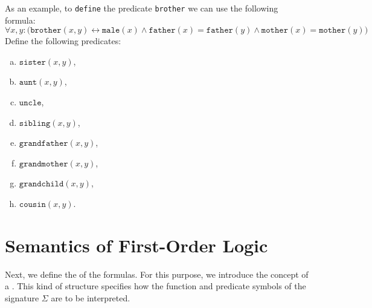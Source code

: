 As an example, to \texttt{define} the predicate \texttt{brother} we can use the following formula:
\\[0.2cm]
\hspace*{1.3cm}
$\forall x, y:\bigl(\mathtt{brother}(x, y) \leftrightarrow \mathtt{male}(x) \wedge \mathtt{father}(x)
= \mathtt{father}(y) \wedge \mathtt{mother}(x) = \mathtt{mother}(y)\bigr)$
\\[0.2cm]
Define the following predicates:
\begin{enumerate}[(a)]
\item $\texttt{sister}(x, y)$,
\item $\texttt{aunt}(x, y)$,
\item $\mathtt{uncle}$,
\item $\texttt{sibling}(x, y)$,
\item $\texttt{grandfather}(x, y)$,
\item $\texttt{grandmother}(x, y)$,
\item $\texttt{grandchild}(x, y)$,
\item $\texttt{cousin}(x, y)$.
  \eox
\end{enumerate}


\section{Semantics of First-Order Logic \label{sec:semantik}}
Next, we define the  of the formulas. For this purpose, we introduce the concept of a
.  This kind of structure specifies how the
function and predicate symbols of the signature $\Sigma$ are to be interpreted.

